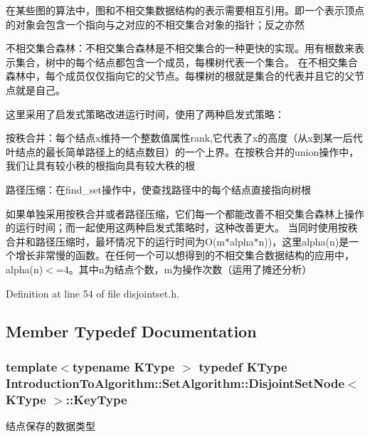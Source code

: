在某些图的算法中，图和不相交集数据结构的表示需要相互引用。即一个表示顶点的对象会包含一个指向与之对应的不相交集合对象的指针；反之亦然

不相交集合森林：不相交集合森林是不相交集合的一种更快的实现。用有根数来表示集合，树中的每个结点都包含一个成员，每棵树代表一个集合。 在不相交集合森林中，每个成员仅仅指向它的父节点。每棵树的根就是集合的代表并且它的父节点就是自己。

这里采用了启发式策略改进运行时间，使用了两种启发式策略：
\begin{DoxyItemize}
\item 按秩合并：每个结点x维持一个整数值属性rank,它代表了x的高度（从x到某一后代叶结点的最长简单路径上的结点数目）的一个上界。在按秩合并的union操作中， 我们让具有较小秩的根指向具有较大秩的根
\item 路径压缩：在{\ttfamily find\+\_\+set}操作中，使查找路径中的每个结点直接指向树根
\end{DoxyItemize}

如果单独采用按秩合并或者路径压缩，它们每一个都能改善不相交集合森林上操作的运行时间；而一起使用这两种启发式策略时，这种改善更大。 当同时使用按秩合并和路径压缩时，最坏情况下的运行时间为\+O(m$\ast$alpha$\ast$n))，这里alpha(n)是一个增长非常慢的函数。在任何一个可以想得到的不相交集合数据结构的应用中， alpha(n)$<$=4。其中n为结点个数，m为操作次数（运用了摊还分析） 

Definition at line 54 of file disjointset.\+h.



\subsection{Member Typedef Documentation}
\hypertarget{struct_introduction_to_algorithm_1_1_set_algorithm_1_1_disjoint_set_node_a8f801679de129d80a99ad683430c534a}{}
\subsubsection[{Key\+Type}]{\setlength{\rightskip}{0pt plus 5cm}template$<$typename K\+Type $>$ typedef K\+Type {\bf Introduction\+To\+Algorithm\+::\+Set\+Algorithm\+::\+Disjoint\+Set\+Node}$<$ K\+Type $>$\+::{\bf Key\+Type}}\label{struct_introduction_to_algorithm_1_1_set_algorithm_1_1_disjoint_set_node_a8f801679de129d80a99ad683430c534a}
结点保存的数据类型 

